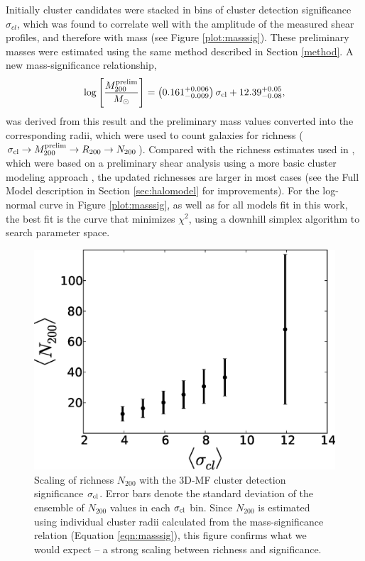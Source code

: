 Initially cluster candidates were stacked in bins of cluster detection significance $\sigma_{cl}$, which was found to correlate well with the amplitude of the measured shear profiles, and therefore with mass (see Figure \ref{plot:masssig}). These preliminary masses were estimated using the same method described in Section \ref{method}. A new mass-significance relationship,
\begin{equation}
\label{eqn:masssig}
\mathrm{log}\left[ \frac{M_{200}^{\rm prelim}}{M_{\odot}} \right] = \left( 0.161^{+0.006}_{-0.009} \right) \sigma_{\rm cl} + 12.39^{+0.05}_{-0.08},
\end{equation}
was derived from this result and the preliminary mass values converted into the corresponding radii, which were used to count galaxies for richness ($\sigma_{\rm cl} \rightarrow M_{200}^{\rm prelim} \rightarrow R_{200} \rightarrow N_{200}$). Compared with the richness estimates used in \citet{Ford14}, which were based on a preliminary shear analysis using a more basic cluster modeling approach \citep{MMthesis11}, the updated richnesses are larger in most cases (see the Full Model description in Section \ref{sec:halomodel} for improvements). For the log-normal curve in Figure \ref{plot:masssig}, as well as for all models fit in this work, the best fit is the curve that minimizes $\chi^2$, using a downhill simplex algorithm to search parameter space.

\begin{figure}
\begin{center}
\vspace{0.2cm}
  \includegraphics[scale=0.7]{plots_ch4/N200vsSig.eps}
  \caption[Richness-Significance Scaling]{Scaling of richness $N_{200}$ with the \ac{3D-MF} cluster detection significance $\sigma_{\rm cl}$. Error bars denote the standard deviation of the ensemble of $N_{200}$ values in each $\sigma_{\rm cl}$ bin. Since $N_{200}$ is estimated using individual cluster radii calculated from the mass-significance relation (Equation \ref{eqn:masssig}), this figure confirms what we would expect -- a strong scaling between richness and significance.}
\label{plot:n200sig} %
\end{center}
\end{figure}

